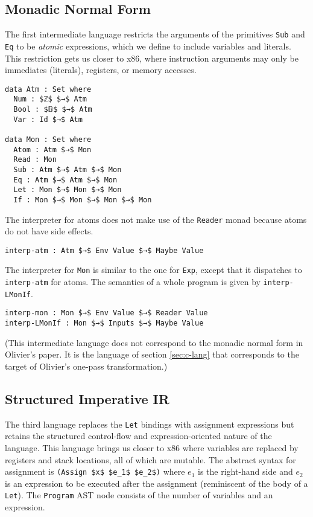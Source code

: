 \documentclass[sigplan,review,dvipsnames,screen,10pt]{acmart}
\begin{document}
\subsection{Monadic Normal Form}

The first intermediate language restricts the arguments of the
primitives \lstinline{Sub} and \lstinline{Eq} to be \emph{atomic}
expressions, which we define to include variables and literals. This
restriction gets us closer to x86, where instruction arguments may
only be immediates (literals), registers, or memory accesses.

\begin{lstlisting}
data Atm : Set where
  Num : $ℤ$ $→$ Atm 
  Bool : $𝔹$ $→$ Atm 
  Var : Id $→$ Atm

data Mon : Set where
  Atom : Atm $→$ Mon
  Read : Mon
  Sub : Atm $→$ Atm $→$ Mon
  Eq : Atm $→$ Atm $→$ Mon
  Let : Mon $→$ Mon $→$ Mon
  If : Mon $→$ Mon $→$ Mon $→$ Mon
\end{lstlisting}

The interpreter for atoms does not make use of the \lstinline{Reader}
monad because atoms do not have side effects.

\begin{lstlisting}
interp-atm : Atm $→$ Env Value $→$ Maybe Value
\end{lstlisting}

The interpreter for \lstinline{Mon} is similar to the
one for \lstinline{Exp}, except that it dispatches
to \lstinline{interp-atm} for atoms. The semantics
of a whole program is given by \lstinline{interp-LMonIf}.

\begin{lstlisting}
interp-mon : Mon $→$ Env Value $→$ Reader Value
interp-LMonIf : Mon $→$ Inputs $→$ Maybe Value
\end{lstlisting}

(This intermediate language does not correspond to the monadic normal
form in Olivier's paper. It is the language of section
\ref{sec:c-lang} that corresponds to the target of Olivier's one-pass
transformation.)

\subsection{Structured Imperative IR}
\label{sec:imp}

The third language replaces the \lstinline{Let} bindings with
assignment expressions but retains the structured control-flow and
expression-oriented nature of the language. This language brings us
closer to x86 where variables are replaced by registers and stack
locations, all of which are mutable. The abstract syntax for
assignment is \lstinline{(Assign $x$ $e_1$ $e_2$)} where $e_1$ is the
right-hand side and $e_2$ is an expression to be executed after the
assignment (reminiscent of the body of a \lstinline{Let}).  The
\lstinline{Program} AST node consists of the number of variables and
an expression.
\end{document}
